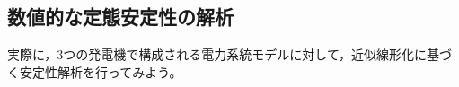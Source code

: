 \documentclass[tombow,dvipdfmx]{corona-a5-1.1}
\begin{document}
\subsection{数値的な定態安定性の解析}

実際に，3つの発電機で構成される電力系統モデルに対して，近似線形化に基づく安定性解析を行ってみよう。

%
\end{document}

